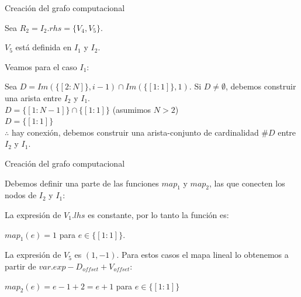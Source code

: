 \begin{frame}{Creación del grafo computacional}

  \footnotesize

  \begin{center}
  \end{center}

  Sea $R_2 = I_2.rhs = \{V_4, V_5\}$.

  $V_5$ está definida en $I_1$ y $I_2$.

  Veamos para el caso $I_1$:

  Sea $D = Im(\{[2:N]\}, i - 1) \cap Im(\{[1:1]\}, 1)$. Si $D \neq \emptyset$, debemos construir una arista
  entre $I_2$ y $I_1$.\\
  $D = \{[1:N-1]\} \cap \{[1:1]\}$ (asumimos $N>2$) \\
  $D = \{[1:1]\}$\\
  $\therefore$ hay conexión, debemos construir una arista-conjunto de cardinalidad $\#D$ entre $I_2$ y $I_1$.

\end{frame}


\begin{frame}[t]{Creación del grafo computacional}

  Debemos definir una parte de las funciones $map_1$ y $map_2$, las que conecten los nodos
  de $I_2$ y $I_1$:

  \vspace{1em}

  La expresión de $V_1.lhs$ es constante, por lo tanto la función es:

  $map_{1}(e) = 1$ para $ e \in \{[1:1]\}$.

  \vspace{1em}

  La expresión de $V_5$ es $(1,-1)$. Para estos casos el mapa lineal lo obtenemos a partir de
  $var.exp - D_{offset} + V_{offset}$:

  $map_{2}(e) = e - 1 + 2 = e + 1$ para $e \in \{[1:1]\}$

\end{frame}



